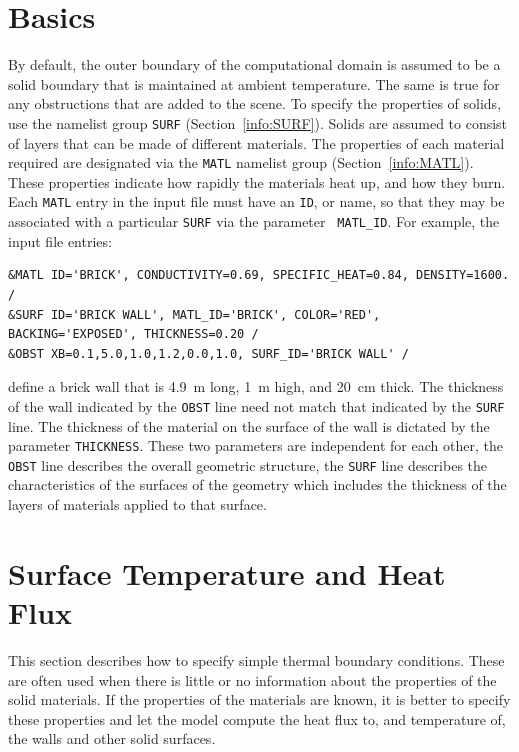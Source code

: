 \documentclass[11pt]{book}
\newcommand{\ct}{\tt\small}
\begin{document}
\section{Basics}
\label{info:SURF_MATL_Basics}

By default, the outer boundary of the computational domain is assumed
to be a solid boundary that is maintained at ambient temperature. The
same is true for any obstructions that are added to the scene. To
specify the properties of solids, use the namelist group {\ct SURF}
(Section~\ref{info:SURF}). Solids are assumed to
consist of layers that can be made of different materials.  The
properties of each material required are designated via the {\ct MATL}
namelist group (Section~\ref{info:MATL}).  These properties indicate how
rapidly the materials heat up, and how they burn.  Each {\ct MATL}
entry in the input file must have an {\ct ID}, or name, so that they
may be associated with a particular {\ct SURF} via the parameter {\ct
MATL\_ID}.  For example, the input file entries:

\footnotesize
\begin{verbatim}
&MATL ID='BRICK', CONDUCTIVITY=0.69, SPECIFIC_HEAT=0.84, DENSITY=1600. /
&SURF ID='BRICK WALL', MATL_ID='BRICK', COLOR='RED', BACKING='EXPOSED', THICKNESS=0.20 /
&OBST XB=0.1,5.0,1.0,1.2,0.0,1.0, SURF_ID='BRICK WALL' /
\end{verbatim}
\normalsize

\noindent
define a brick wall that is 4.9~m long, 1~m high, and 20~cm thick. The thickness of the wall indicated by the {\ct OBST} line need not
match that indicated by the {\ct SURF} line. The thickness of the material on the surface of the wall
is dictated by the parameter {\ct THICKNESS}.  These two parameters are independent for each other,
the {\ct OBST} line describes the overall geometric structure, the {\ct SURF} line describes the
characteristics of the surfaces of the geometry which includes the thickness of the layers of
materials applied to that surface.



\clearpage

\section{Surface Temperature and Heat Flux}

This section describes how to specify simple thermal boundary conditions. These are often used when there is little or no
information about the properties of the solid materials. If the properties of the materials are known, it is better to specify these
properties and let the model compute the heat flux to, and temperature of, the walls and other solid surfaces.
\end{document}
